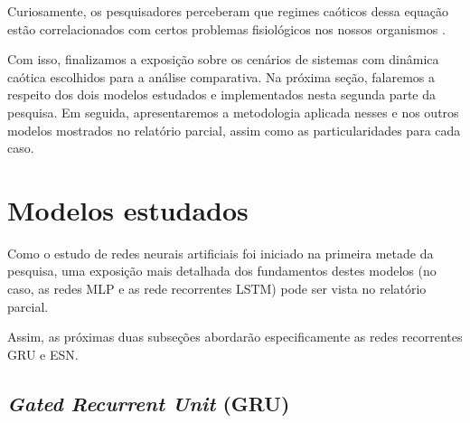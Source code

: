 \documentclass[a4paper, 12pt]{article}
\begin{document}
Curiosamente, os pesquisadores perceberam que regimes caóticos dessa equação estão correlacionados com certos problemas fisiológicos nos nossos organismos \cite{mackey1977oscillation}.

Com isso, finalizamos a exposição sobre os cenários de sistemas com dinâmica caótica escolhidos para a análise comparativa. Na próxima seção, falaremos a respeito dos dois modelos estudados e implementados nesta segunda parte da pesquisa. Em seguida, apresentaremos a metodologia aplicada nesses e nos outros modelos mostrados no relatório parcial, assim como as particularidades para cada caso.

\section{Modelos estudados}

Como o estudo de redes neurais artificiais foi iniciado na primeira metade da pesquisa, uma exposição mais detalhada dos fundamentos destes modelos (no caso, as redes MLP e as rede recorrentes LSTM) pode ser vista no relatório parcial.

Assim, as próximas duas subseções abordarão especificamente as redes recorrentes GRU e ESN.

\subsection{\textit{Gated Recurrent Unit} (GRU)}
\end{document}
